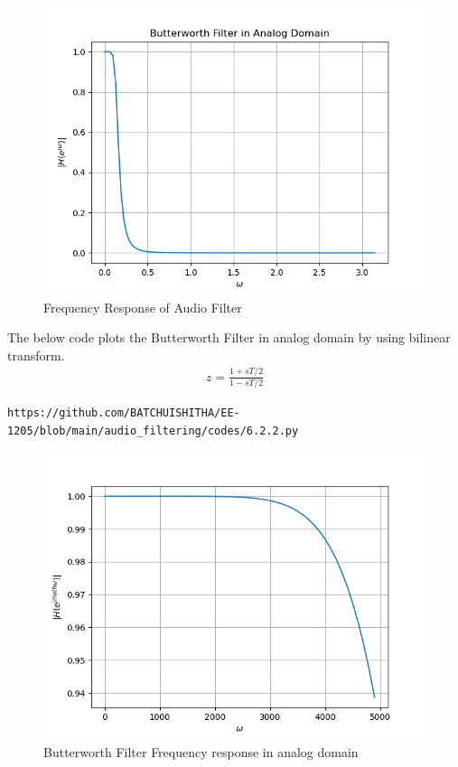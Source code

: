 \documentclass[journal,12pt,twocolumn]{IEEEtran}
\theoremstyle{remark}
\begin{document}
\begin{enumerate}[label=\thesection.\arabic*]
\begin{figure}[ht]
\includegraphics[width=1\columnwidth]{figs/6.2.1.png}
\caption{Frequency Response of Audio Filter}
\label{fig:6.2.1}
\end{figure}
The below code plots the Butterworth Filter in analog domain by using bilinear transform.
\begin{align}
    z=\frac{1+sT/2}{1-sT/2}
\end{align}
\begin{lstlisting}
https://github.com/BATCHUISHITHA/EE-1205/blob/main/audio_filtering/codes/6.2.2.py
\end{lstlisting}
\begin{figure}[ht]
\centering
\includegraphics[width=1\columnwidth]{figs/6.2.2.png}
\caption{Butterworth Filter Frequency response in analog domain}

\end{figure}
\end{enumerate}
\end{document}
